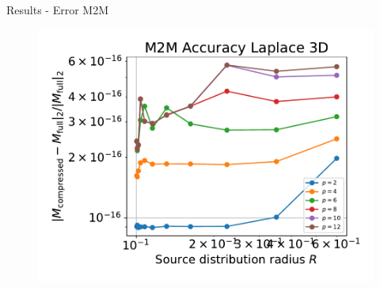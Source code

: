 \documentclass[10pt]{beamer}
\begin{document}
\begin{frame}[fragile]{Results - Error M2M}
\begin{figure}
\includegraphics[scale=0.3]{figures/accuracy-laplace-3d.pdf}
\end{figure}
\end{frame}
\end{document}
